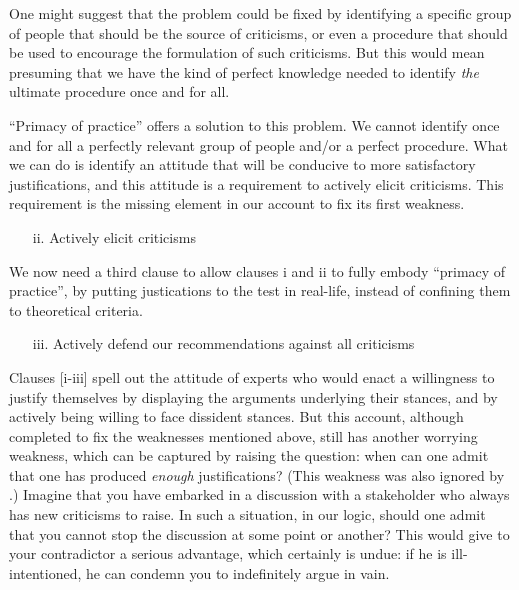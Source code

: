 \documentclass[preprint, french, english, 11pt, authoryear]{elsarticle}%
\begin{document}
One might suggest that the problem could be fixed by identifying a specific group of people that should be the source of criticisms, or even a procedure that should be used to encourage the formulation of such criticisms. But this would mean presuming that we have the kind of perfect knowledge needed to identify \emph{the} ultimate procedure once and for all.

``Primacy of practice” offers a solution to this problem. We cannot identify once and for all a perfectly relevant group of people and/or a perfect procedure. What we can do is identify an attitude that will be conducive to more satisfactory justifications, and this attitude is a requirement to actively elicit criticisms. This requirement is the missing element in our account to fix its first weakness.

\begin{itemize}
\item[ii.]	Actively elicit criticisms
\end{itemize}

We now need a third clause to allow clauses i and ii to fully embody “primacy of practice”, by putting justications to the test in real-life, instead of confining them to theoretical criteria.

\begin{itemize}
\item[iii.]	 Actively defend our recommendations against all criticisms
\end{itemize}

Clauses [i-iii] spell out the attitude of experts who would enact a willingness to justify themselves by displaying the arguments underlying their stances, and by actively being willing to face dissident stances. But this account, although completed to fix the weaknesses mentioned above, still has another worrying weakness, which can be captured by raising the question: when can one admit that one has produced \emph{enough} justifications? (This weakness was also ignored by  \citet{meinard_what_2017}.) Imagine that you have embarked in a discussion with a stakeholder who always has new criticisms to raise. In such a situation, in our logic, should one admit that you cannot stop the discussion at some point or another? This would give to your contradictor a serious advantage, which certainly is undue: if he is ill-intentioned, he can condemn you to indefinitely argue in vain.
\end{document}
